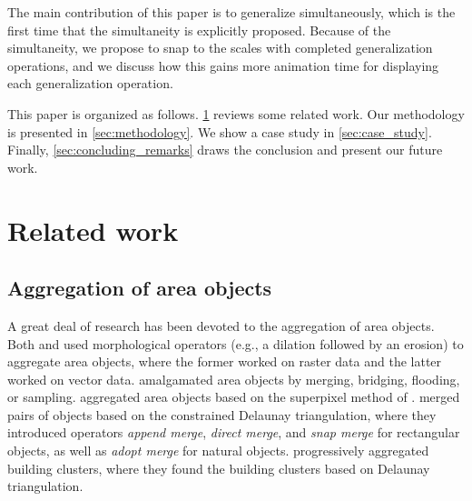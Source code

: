 \documentclass[twocolumn]{svjour3}          %
\begin{document}
The main contribution of this paper is 
to generalize simultaneously,
which is the first time that the simultaneity 
is explicitly proposed.
Because of the simultaneity, 
we propose to snap to the scales with completed generalization operations,
and we discuss how this gains more animation time 
for displaying each generalization operation.


This paper is organized as follows.
\sect\ref{sec:realted_work} reviews some related work.
Our methodology is presented in \sect\ref{sec:methodology}.
We show a case study in \sect\ref{sec:case_study}.
Finally, \sect\ref{sec:concluding_remarks} draws the conclusion
and present our future work.



\section{Related work}
\label{sec:realted_work}



\subsection{Aggregation of area objects}
A great deal of research has been devoted to the aggregation of area objects.
Both \citet{Su1997aggregation} and \citet{Sester2005Optimization} 
used morphological operators (e.g., a dilation followed by an erosion)
to aggregate area objects, 
where the former worked on raster data and the latter worked on vector data.
\citet{Regnauld2003Amalgamation} 
amalgamated area objects
by merging, bridging, flooding, or sampling. 
\citet{Shen2019Aggregation} aggregated area objects
based on the superpixel method of \citet{Achanta2012SLIC}.
\citet{Ware1995Areal} merged pairs of objects 
based on the constrained Delaunay triangulation,
where they introduced operators 
\emph{append merge}, \emph{direct merge}, and \emph{snap merge}
for rectangular objects, as well as \emph{adopt merge} for natural objects. 
\citet{Ai2007Aggregation} progressively aggregated building clusters,
where they found the building clusters based on Delaunay triangulation.



\end{document}
